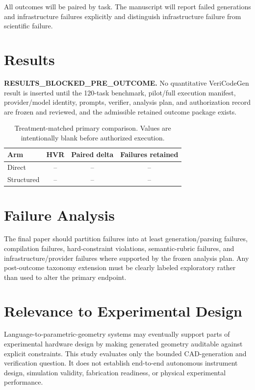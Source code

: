 \documentclass[conference]{IEEEtran}
\begin{document}
All outcomes will be paired by task. The manuscript will report failed generations and infrastructure failures explicitly and distinguish infrastructure failure from scientific failure.

\section{Results}
\textbf{RESULTS\_BLOCKED\_PRE\_OUTCOME.} No quantitative VeriCodeGen result is inserted until the 120-task benchmark, pilot/full execution manifest, provider/model identity, prompts, verifier, analysis plan, and authorization record are frozen and reviewed, and the admissible retained outcome package exists.

\begin{table}[t]
\centering
\caption{Treatment-matched primary comparison. Values are intentionally blank before authorized execution.}
\begin{tabular}{lccc}
\toprule
Arm & HVR & Paired delta & Failures retained \\
\midrule
Direct & -- & -- & -- \\
Structured & -- & -- & -- \\
\bottomrule
\end{tabular}
\end{table}

\section{Failure Analysis}
The final paper should partition failures into at least generation/parsing failures, compilation failures, hard-constraint violations, semantic-rubric failures, and infrastructure/provider failures where supported by the frozen analysis plan. Any post-outcome taxonomy extension must be clearly labeled exploratory rather than used to alter the primary endpoint.

\section{Relevance to Experimental Design}
Language-to-parametric-geometry systems may eventually support parts of experimental hardware design by making generated geometry auditable against explicit constraints. This study evaluates only the bounded CAD-generation and verification question. It does not establish end-to-end autonomous instrument design, simulation validity, fabrication readiness, or physical experimental performance.
\end{document}
